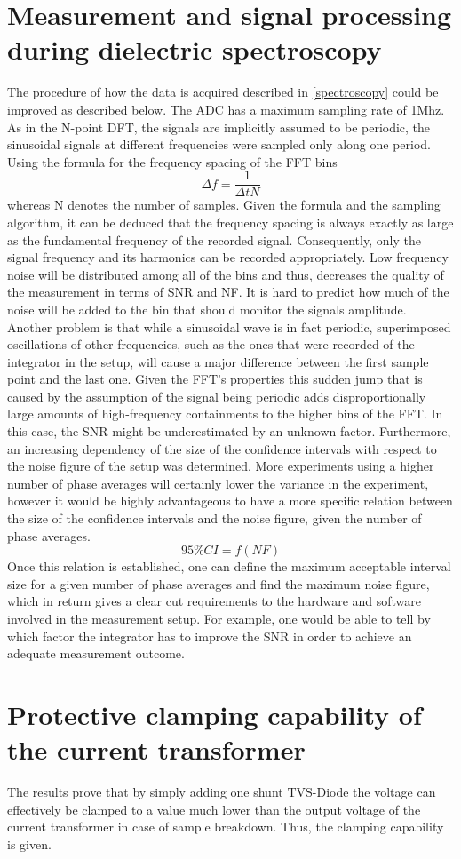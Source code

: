 \section{Measurement and signal processing during dielectric spectroscopy}
The procedure of how the data is acquired described in \ref{spectroscopy}
could be improved as described below. The ADC has a maximum sampling rate of
1Mhz. As in the N-point DFT, the signals are implicitly assumed to be periodic,
the sinusoidal signals at different frequencies were sampled only along one period.
Using the formula for the frequency spacing of the FFT bins
\begin{equation}
 \Delta f=\frac{1}{\Delta t N}
\end{equation}
whereas N denotes the number of samples. 
Given the formula and the sampling algorithm, it can be deduced that the frequency spacing is
always exactly as large as the fundamental frequency of the recorded signal.
Consequently, only the signal frequency and its harmonics can be recorded appropriately.
Low frequency noise will be distributed among all of the bins and thus, decreases
the quality of the measurement in terms of SNR and NF. It is hard to predict how much of the noise will be added to the bin that should
monitor the signals amplitude. 
Another problem is that while a sinusoidal wave is in fact periodic, superimposed oscillations of other frequencies, such as the ones that
were recorded of the integrator in the setup, will cause a major difference between the first sample point and the last one. 
Given the FFT's properties this sudden jump that is caused by the assumption of the signal being periodic adds
disproportionally large amounts of high-frequency containments to the higher bins of the FFT. In this case, the SNR might be underestimated by an unknown factor. 
\newline
Furthermore, an increasing dependency of the size of the confidence intervals with respect to the noise figure of
the setup was determined. 
More experiments using a higher number of phase averages will certainly lower the variance in the experiment, however it would 
be highly advantageous to have a more specific relation between the size of the confidence intervals
and the noise figure, given the number of phase averages.
\begin{equation}
 95 \% CI=f\left(NF\right)
\end{equation}
Once this relation is established, one can define the maximum acceptable
interval size for a given number of phase averages and find the maximum noise figure, 
which in return gives a clear cut requirements to the hardware and software involved in the measurement setup.
For example, one would be able to tell by which factor the integrator has to improve the SNR in order to achieve
an adequate measurement outcome.


\section{Protective clamping capability of the current transformer}
The results prove that by simply adding one shunt TVS-Diode the voltage can effectively be clamped to a value much lower
than the output voltage of the current transformer in case of sample breakdown. Thus, the clamping capability is given. 
